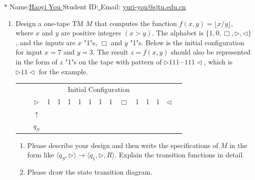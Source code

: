 \documentclass[12pt,a4paper]{article}
\theoremstyle{definition}
\begin{document}
\noindent

\noindent{}
\begin{center}
\footnotesize{\color{blue}$*$ Name:\underline{\quad   Haoyi You  \quad  }\quad Student ID:\underline{ \quad} \quad Email: \underline{\quad yuri-you@sjtu.edu.cn \quad}}
\end{center}

\begin{enumerate}
    \item Design a one-tape TM $M$ that computes the function $f(x, y) = \lfloor x/y \rfloor$, where $x$ and $y$ are positive integers $(x > y)$. The alphabet is $\{1, 0, \Box, \triangleright, \triangleleft\}$, and the inputs are $x$ "1"s, $\Box$ and $y$ "1"s. Below is the initial configuration for input $x=7$ and $y=3$. The result $z=f(x,y)$ should also be represented in the form of $z$ "1"s on the tape with pattern of $\rhd 111\cdots 111\lhd$, which is $\rhd 11\lhd$ for the example.
    
	\begin{center}
		\begin{tabular}{ll|c|c|c|c|c|c|c|c|c|c|c|c|c|c}
			& \multicolumn{14}{c}{Initial Configuration}\\[5pt]
			\cline{2-16}
			& & $\triangleright$ &  1  & 1 & 1 & 1 & 1 & 1 & 1 & $\Box$ & 1 & 1 & 1 & $ \triangleleft$ & \\
			\cline{2-16}
			\multicolumn{2}{c}{} & \multicolumn{1}{c}{$\uparrow$} & \multicolumn{11}{c}{}\\[-4pt]
			\multicolumn{2}{c}{} & \multicolumn{1}{c}{$q_S$} & \multicolumn{11}{c}{}	
		\end{tabular}
	\end{center}

    \begin{enumerate}
	\item
	Please describe your design and then write the specifications of $M$ in the form like $\langle q_S, \triangleright \rangle \rightarrow \langle q_1, \triangleright,  R\rangle$. Explain the transition functions in detail.
	
	\item
	Please draw the state transition diagram.
	

\end{enumerate}
\end{enumerate}
\end{document}
